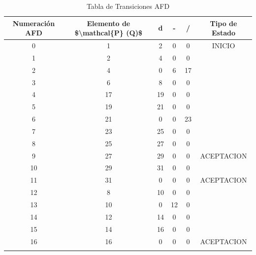 \begin{longtable}{||c|c||ccc||c||}
\hline
\hline
Numeración AFD & Elemento de \$\textbackslash{}mathcal\{P\} (Q)\$ & d  & -  & /  & Tipo de Estado  \\
\hline
\hline
0              & 1                                                & 2  & 0  & 0  & INICIO          \\
1              & 2                                                & 4  & 0  & 0  &                 \\
2              & 4                                                & 0  & 6  & 17 &                 \\
3              & 6                                                & 8  & 0  & 0  &                 \\
4              & 17                                               & 19 & 0  & 0  &                 \\
5              & 19                                               & 21 & 0  & 0  &                 \\
6              & 21                                               & 0  & 0  & 23 &                 \\
7              & 23                                               & 25 & 0  & 0  &                 \\
8              & 25                                               & 27 & 0  & 0  &                 \\
9              & 27                                               & 29 & 0  & 0  & ACEPTACION      \\
10             & 29                                               & 31 & 0  & 0  &                 \\
11             & 31                                               & 0  & 0  & 0  & ACEPTACION      \\
12             & 8                                                & 10 & 0  & 0  &                 \\
13             & 10                                               & 0  & 12 & 0  &                 \\
14             & 12                                               & 14 & 0  & 0  &                 \\
15             & 14                                               & 16 & 0  & 0  &                 \\
16             & 16                                               & 0  & 0  & 0  & ACEPTACION      \\
\hline
\hline

\caption{Tabla de Transiciones AFD}
\label{AFDfechas}
\end{longtable}

